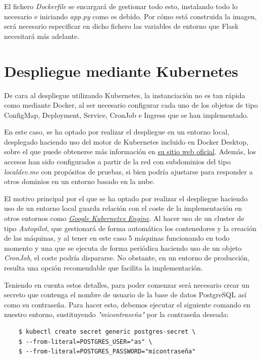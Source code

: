 \documentclass{report}
\begin{document}
            El fichero \textit{Dockerfile} se encargará de gestionar todo esto, instalando todo lo necesario e iniciando \textit{app.py} como es debido. Por cómo está construida la imagen, será necesario especificar en dicho fichero las variables de entorno que Flask necesitará más adelante.

        \section{Despliegue mediante Kubernetes}

            De cara al despliegue utilizando Kubernetes, la instanciación no es tan rápida como mediante Docker, al ser necesario configurar cada uno de los objetos de tipo ConfigMap, Deployment, Service, CronJob e Ingress que se han implementado.

            En este caso, se ha optado por realizar el despliegue en un entorno local, desplegado haciendo uso del motor de Kubernetes incluido en Docker Desktop, sobre el que puede obtenerse más información en \href{https://docs.docker.com/desktop/features/kubernetes/}{su sitio web oficial}. Además, los accesos han sido configurados a partir de la red con subdominios del tipo \textit{localdev.me} con propósitos de pruebas, si bien podría ajustarse para responder a otros dominios en un entorno basado en la nube.

            El motivo principal por el que se ha optado por realizar el despliegue haciendo uso de un entorno local guarda relación con el coste de la implementación en otros entornos como \textit{\href{https://cloud.google.com/kubernetes-engine/pricing}{Google Kubernetes Engine}}. Al hacer uso de un cluster de tipo \textit{Autopilot}, que gestionará de forma automática los contenedores y la creación de las máquinas, y al tener en este caso 5 máquinas funcionando en todo momento y una que se ejecuta de forma periódica haciendo uso de un objeto \textit{CronJob}, el coste podría dispararse. No obstante, en un entorno de producción, resulta una opción recomendable que facilita la implementación.

            Teniendo en cuenta estos detalles, para poder comenzar será necesario crear un secreto que contenga el nombre de usuario de la base de datos PostgreSQL así como su contraseña. Para hacer esto, debemos ejecutar el siguiente comando en nuestro entorno, sustituyendo \textit{"micontraseña"} por la contraseña deseada:

            \begin{verbatim}
    $ kubectl create secret generic postgres-secret \
    $ --from-literal=POSTGRES_USER="as" \
    $ --from-literal=POSTGRES_PASSWORD="micontraseña"
            \end{verbatim}
\end{document}
